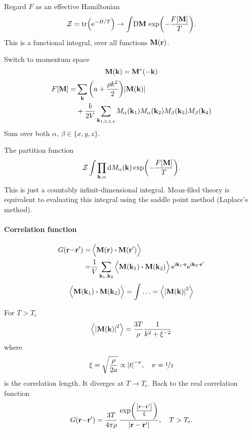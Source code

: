 \documentclass[11pt,letter, swedish, english, twocolumn
]{article}
\newcommand{\ZZ}{\ensuremath{\mathcal{Z}}}
\newcommand{\Tc}{\ensuremath{{T_{\text{c}}}}}
\newcommand{\rD}{\ensuremath{{\mathrm{D}}}}
\begin{document}
Regard $F$ as an effective Hamiltonian
\begin{equation}
\ZZ=\tr(\ee^{-H/T})\to\int\!\rD\vb{M}\,
\exp(-\frac{F[\vb{M}]}{T}).
\end{equation}
This is a functional integral, over all functions $\vb{M}(\vb{r})$. 

Switch to momentum space
\begin{equation}
\vb{M}(\vb{k})=\vb{M}^*(-\vb{k})
\end{equation}
\begin{equation}
\begin{aligned}
F[\vb{M}]=&\sum_{\vb{k}}\qty(a+\frac{\rho k^2}{2})\abs{\vb{M}(\vb{k})}\\
&+\frac{b}{2V}\sum_{\vb{k}_{1, 2, 3, 4}}
M_\alpha(\vb{k}_1)M_\alpha(\vb{k}_2) M_\beta(\vb{k}_3)M_\beta(\vb{k}_4)
\end{aligned}
\end{equation}
Sum over both $\alpha,\,\beta\in\{x, y, z\}$.

The partition function
\begin{equation}
\ZZ \int \prod_{\vb{k}, \alpha} \rd{M_\alpha}(\vb{k}) \exp(-\frac{F[\vb{M}]}{T}).
\end{equation}
This is just a countably infinit-dimensional integral.
Mean-filed theory is equivalent to evaluating this integral using the
saddle point method (Laplace's method).

\paragraph{Correlation function}
\begin{equation}
\begin{aligned}
G(\vb{r}{-}\vb{r}')=&\ev{\Big.\vb{M}(\vb{r})\vdot\vb{M}(\vb{r}')}\\
=&\frac{1}{V}\sum_{\vb{k}_1,\vb{k}_2}
\ev{\Big.\vb{M}(\vb{k}_1)\vdot\vb{M}(\vb{k}_2)}
\ee^{\ii\vb{k}_1\vdot\vb{r}}\ee^{\ii\vb{k}_2\vdot\vb{r}'}
\end{aligned}
\end{equation}
\begin{equation}
\ev{\Big.\vb{M}(\vb{k}_1)\vdot\vb{M}(\vb{k}_2)}=\int\ldots=
\ev{\abs{\vb{M}(\vb{k})}^2}
\end{equation}

For $T>\Tc$
\begin{equation}
\ev{\abs{\vb{M}(\vb{k})}^2}=\frac{3T}{\rho}\frac{1}{k^2+\xi^{-2}}
\end{equation}
where
\begin{equation}
\xi=\sqrt{\frac{\rho}{2a}}\propto \abs{t}^{-\nu}
\qcomma \nu=\nicefrac{1}{2}
\end{equation}
is the correlation length. It diverges at $T\to\Tc$.
Back to the real correlation function
\begin{equation}
\begin{aligned}
G(\vb{r}{-}\vb{r}')=\frac{3T}{4\pi\rho}\,
\frac{\exp(\frac{\abs{\vb{r}-\vb{r}'}}{\xi})}{\abs{\vb{r}-\vb{r}'}}
\qcomma T>\Tc.
\end{aligned}
\end{equation}
\end{document}
